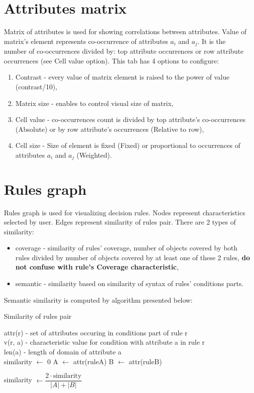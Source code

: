 \documentclass[12pt]{article}
\newlength\mylen
\newcommand\myinput[1]{%
  \settowidth\mylen{\KwIn{}}%
  \setlength\hangindent{\mylen}%
  \hspace*{\mylen}#1\\}
\begin{document}
\section{Attributes matrix}

Matrix of attributes is used for showing correlations between attributes. Value of matrix's element represents co-occurrence of attributes $a_i$ and $a_j$. It is the number of co-occurrences divided by: top attribute occurrences or row attribute occurrences (see Cell value option). This tab has 4 options to configure:
\begin{enumerate}
    \setlength\itemsep{0em}
    \item Contrast - every value of matrix element is raised to the power of value (contrast/10),
    \item Matrix size - enables to control visual size of matrix,
    \item Cell value - co-occurrences count is divided by top attribute's co-occurrences (Absolute) or by row attribute's occurrences (Relative to row),
    \item Cell size - Size of element is fixed (Fixed) or proportional to occurrences of attributes $a_i$ and $a_j$ (Weighted).
\end{enumerate}

\section{Rules graph}

Rules graph is used for visualizing decision rules. Nodes represent characteristics selected by user. Edges represent similarity of rules pair. There are 2 types of similarity:
\begin{itemize}
    \setlength\itemsep{0em}
    \item coverage - similarity of rules' coverage, number of objects covered by both rules divided by number of objects covered by at least one of these 2 rules, \textbf{do not confuse with rule's Coverage characteristic},
    \item semantic - similarity based on similarity of syntax of rules' conditions parts.
\end{itemize}

Semantic similarity is computed by algorithm presented below:

\begin{algorithm}[H]
    \caption{Similarity of rules pair}
    \myinput{attr(r) - set of attributes occuring in conditions part of rule r}
    \myinput{v(r, a) - characteristic value for condition with attribute a in rule r}
    \myinput{len(a) - length of domain of attribute a}
    \BlankLine
    similarity $\gets$ 0\;
    A $\gets$ attr(ruleA)\;
    B $\gets$ attr(ruleB)\;
    
    similarity $\gets \dfrac{2 \cdot \text{similarity}}{ |A| + |B|}$ \;
\end{algorithm}
\end{document}
